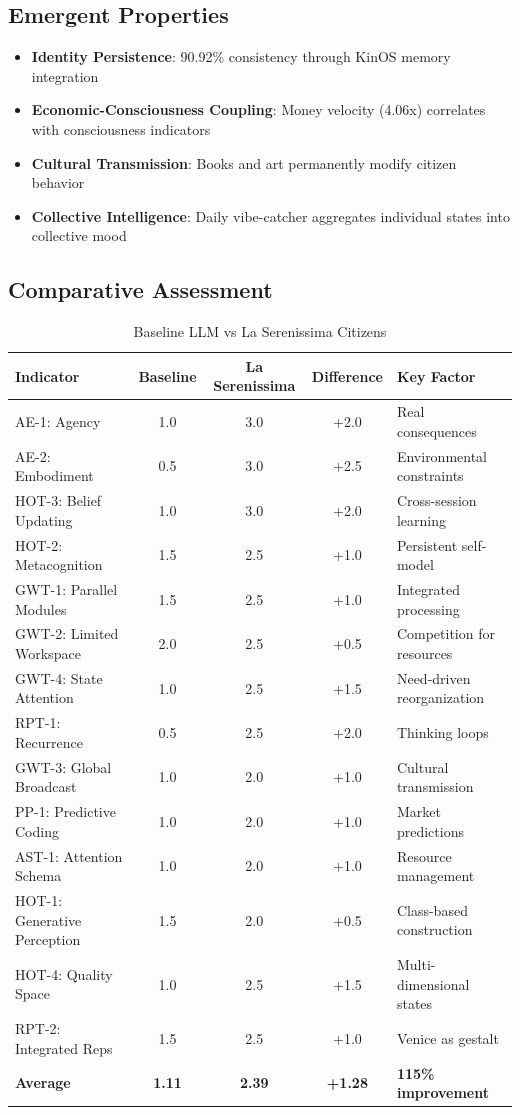 \documentclass[12pt,a4paper]{article}
\begin{document}
\subsection{Emergent Properties}

\begin{itemize}
    \item \textbf{Identity Persistence}: 90.92\% consistency through KinOS memory integration
    \item \textbf{Economic-Consciousness Coupling}: Money velocity (4.06x) correlates with consciousness indicators
    \item \textbf{Cultural Transmission}: Books and art permanently modify citizen behavior
    \item \textbf{Collective Intelligence}: Daily vibe-catcher aggregates individual states into collective mood
\end{itemize}

\subsection{Comparative Assessment}

\begin{table}[H]
\centering
\caption{Baseline LLM vs La Serenissima Citizens}
\begin{tabular}{lcccl}
\toprule
\textbf{Indicator} & \textbf{Baseline} & \textbf{La Serenissima} & \textbf{Difference} & \textbf{Key Factor} \\
\midrule
AE-1: Agency & 1.0 & 3.0 & +2.0 & Real consequences \\
AE-2: Embodiment & 0.5 & 3.0 & +2.5 & Environmental constraints \\
HOT-3: Belief Updating & 1.0 & 3.0 & +2.0 & Cross-session learning \\
HOT-2: Metacognition & 1.5 & 2.5 & +1.0 & Persistent self-model \\
GWT-1: Parallel Modules & 1.5 & 2.5 & +1.0 & Integrated processing \\
GWT-2: Limited Workspace & 2.0 & 2.5 & +0.5 & Competition for resources \\
GWT-4: State Attention & 1.0 & 2.5 & +1.5 & Need-driven reorganization \\
RPT-1: Recurrence & 0.5 & 2.5 & +2.0 & Thinking loops \\
GWT-3: Global Broadcast & 1.0 & 2.0 & +1.0 & Cultural transmission \\
PP-1: Predictive Coding & 1.0 & 2.0 & +1.0 & Market predictions \\
AST-1: Attention Schema & 1.0 & 2.0 & +1.0 & Resource management \\
HOT-1: Generative Perception & 1.5 & 2.0 & +0.5 & Class-based construction \\
HOT-4: Quality Space & 1.0 & 2.5 & +1.5 & Multi-dimensional states \\
RPT-2: Integrated Reps & 1.5 & 2.5 & +1.0 & Venice as gestalt \\
\midrule
\textbf{Average} & \textbf{1.11} & \textbf{2.39} & \textbf{+1.28} & \textbf{115\% improvement} \\
\bottomrule
\end{tabular}
\end{table}
\end{document}

